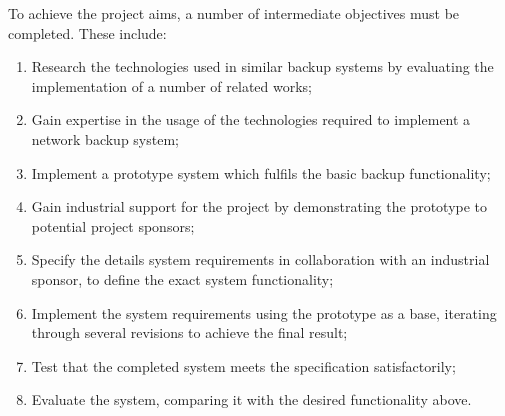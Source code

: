 To achieve the project aims, a number of intermediate objectives must be
completed. These include:

\begin{enumerate}
    \item Research the technologies used in similar backup systems by
        evaluating the implementation of a number of related works;
    \item Gain expertise in the usage of the technologies required to implement
        a network backup system;
    \item Implement a prototype system which fulfils the basic backup
        functionality;
    \item Gain industrial support for the project by demonstrating the
        prototype to potential project sponsors;
    \item Specify the details system requirements in collaboration with an
        industrial sponsor, to define the exact system functionality;
    \item Implement the system requirements using the prototype as a base,
        iterating through several revisions to achieve the final result;
    \item Test that the completed system meets the specification
        satisfactorily;
    \item Evaluate the system, comparing it with the desired functionality
        above.
\end{enumerate}
